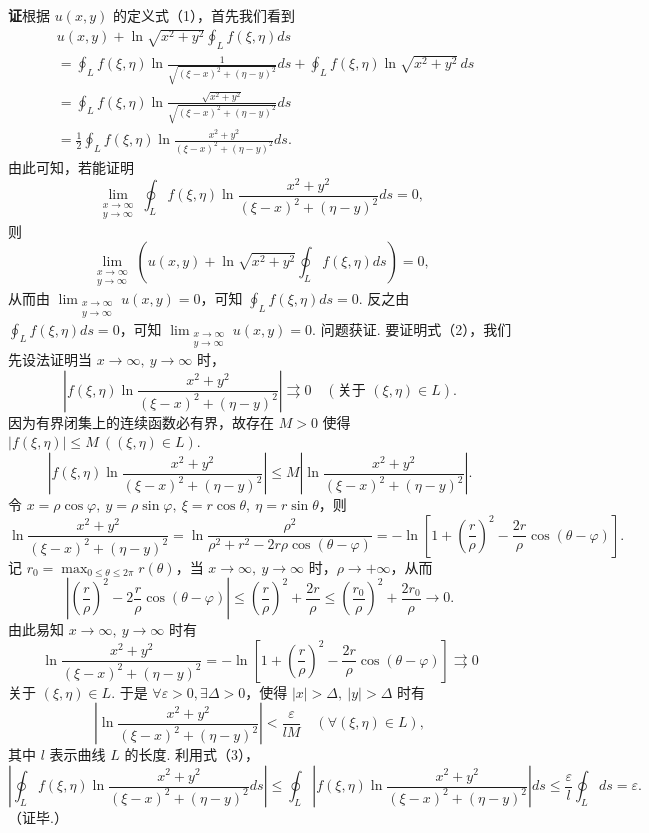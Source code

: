 \documentclass[UTF8,12pt,a4paper,fontset=fandol]{ctexart}
\begin{document}
\noindent\textbf{证}\quad 根据 $u(x,y)$ 的定义式（1），首先我们看到
\[
\begin{aligned}
&u(x,y)+\ln\sqrt{x^2+y^2}\oint_Lf(\xi,\eta)ds\\
&=\oint_Lf(\xi,\eta)\ln\frac1{\sqrt{(\xi-x)^2+(\eta-y)^2}}ds
+\oint_Lf(\xi,\eta)\ln\sqrt{x^2+y^2}\,ds\\
&=\oint_Lf(\xi,\eta)\ln
\frac{\sqrt{x^2+y^2}}{\sqrt{(\xi-x)^2+(\eta-y)^2}}ds\\
&=\frac12\oint_Lf(\xi,\eta)
\ln\frac{x^2+y^2}{(\xi-x)^2+(\eta-y)^2}ds.
\end{aligned}
\]
由此可知，若能证明
\[
\lim_{\substack{x\to\infty\\ y\to\infty}}
\oint_Lf(\xi,\eta)
\ln\frac{x^2+y^2}{(\xi-x)^2+(\eta-y)^2}ds=0, \tag{2}
\]
则
\[
\lim_{\substack{x\to\infty\\ y\to\infty}}
\left(u(x,y)+\ln\sqrt{x^2+y^2}\oint_Lf(\xi,\eta)ds\right)=0,
\]
从而由 $\displaystyle\lim_{\substack{x\to\infty\\ y\to\infty}}u(x,y)=0$，可知 $\displaystyle\oint_Lf(\xi,\eta)ds=0$. 反之由 $\displaystyle\oint_Lf(\xi,\eta)ds=0$，可知 $\displaystyle\lim_{\substack{x\to\infty\\ y\to\infty}}u(x,y)=0$. 问题获证. 要证明式（2），我们先设法证明当 $x\to\infty,\ y\to\infty$ 时，
\[
\left|f(\xi,\eta)\ln\frac{x^2+y^2}{(\xi-x)^2+(\eta-y)^2}\right|\rightrightarrows0
\quad(\text{关于 }(\xi,\eta)\in L).
\]
因为有界闭集上的连续函数必有界，故存在 $M>0$ 使得
$|f(\xi,\eta)|\le M\ ((\xi,\eta)\in L)$. 
\[
\left|f(\xi,\eta)\ln\frac{x^2+y^2}{(\xi-x)^2+(\eta-y)^2}\right|
\le M\left|\ln\frac{x^2+y^2}{(\xi-x)^2+(\eta-y)^2}\right|. \tag{3}
\]
令 $x=\rho\cos\varphi,\ y=\rho\sin\varphi,\ \xi=r\cos\theta,\ \eta=r\sin\theta$，则
\[
\ln\frac{x^2+y^2}{(\xi-x)^2+(\eta-y)^2}
=\ln\frac{\rho^2}{\rho^2+r^2-2r\rho\cos(\theta-\varphi)}
=-\ln\left[1+\left(\frac r\rho\right)^2-\frac{2r}\rho\cos(\theta-\varphi)\right].
\]
记 $r_0=\max_{0\le\theta\le2\pi}r(\theta)$，当 $x\to\infty,\ y\to\infty$ 时，$\rho\to+\infty$，从而
\[
\left|\left(\frac r\rho\right)^2-2\frac r\rho\cos(\theta-\varphi)\right|
\le\left(\frac r\rho\right)^2+\frac{2r}\rho
\le\left(\frac{r_0}\rho\right)^2+\frac{2r_0}\rho\to0.
\]
由此易知 $x\to\infty,\ y\to\infty$ 时有
\[
\ln\frac{x^2+y^2}{(\xi-x)^2+(\eta-y)^2}
=-\ln\left[1+\left(\frac r\rho\right)^2-\frac{2r}\rho\cos(\theta-\varphi)\right]\rightrightarrows0
\]
关于 $(\xi,\eta)\in L$. 于是 $\forall\varepsilon>0,\exists\Delta>0$，使得 $|x|>\Delta,\ |y|>\Delta$ 时有
\[
\left|\ln\frac{x^2+y^2}{(\xi-x)^2+(\eta-y)^2}\right|
<\frac{\varepsilon}{lM}\quad(\forall(\xi,\eta)\in L),
\]
其中 $l$ 表示曲线 $L$ 的长度. 利用式（3），
\[
\left|\oint_Lf(\xi,\eta)\ln\frac{x^2+y^2}{(\xi-x)^2+(\eta-y)^2}ds\right|
\le\oint_L\left|f(\xi,\eta)\ln\frac{x^2+y^2}{(\xi-x)^2+(\eta-y)^2}\right|ds
\le\frac{\varepsilon}{l}\oint_Lds=\varepsilon.
\]
（证毕.）
\end{document}
